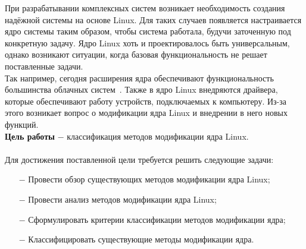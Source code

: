 
При разрабатывании комплексных систем возникает необходимость создания надёжной системы на основе Linux.
Для таких случаев появляется настраивается ядро системы таким образом,
чтобы система работала, будучи заточенную под конкретную задачу.
Ядро Linux хоть и проектировалось быть универсальным, однако возникают ситуации, когда базовая функциональность не решает поставленные задачи.\\

Так например, сегодня расширения ядра обеспечивают
функциональность большинства облачных систем~\cite{cloud-kernel}.
Также в ядро Linux внедряются драйвера, которые обеспечивают работу устройств, подключаемых к компьютеру.
Из-за этого возникает вопрос о модификации ядра Linux и внедрении в него новых функций.
\vspace{0.1cm}
\\
\textbf{Цель работы} $-$ классификация методов модификации ядра Linux.
\\
\vspace{0.1cm}
\\
Для достижения поставленной цели требуется решить следующие задачи: %
\begin{itemize}
    \item[$-$] Провести обзор существующих методов модификации ядра Linux;
    \item[$-$] Провести анализ методов модификации ядра Linux;
    \item[$-$] Сформулировать критерии классификации методов модификации ядра;
    \item[$-$] Классифицировать существующие методы модификации ядра.
\end{itemize}
